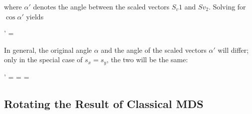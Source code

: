 where $\alpha'$ denotes the angle between the scaled vectors $S_v1$ and $Sv_2$. Solving for $\cos \alpha'$ yields

\bee
\cos \alpha' = 
\eee

In general, the original angle $\alpha$ and the angle of the scaled vectors $\alpha'$ will differ; only in the special case of $s_x=s_y$, the two will be the same:

\bee
\cos \alpha' =  = \frac{\cos \alpha}{\sqrt{\cos^2 \alpha + \sin^2 \alpha}} = \cos \alpha
\eee


\subsection{Rotating the Result of Classical MDS}

